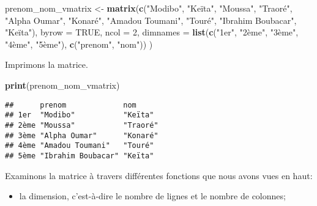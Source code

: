 \documentclass[]{book}
\newenvironment{Shaded}{\begin{snugshade}}{\end{snugshade}}
\newcommand{\KeywordTok}[1]{\textcolor[rgb]{0.13,0.29,0.53}{\textbf{#1}}}
\newcommand{\DataTypeTok}[1]{\textcolor[rgb]{0.13,0.29,0.53}{#1}}
\newcommand{\DecValTok}[1]{\textcolor[rgb]{0.00,0.00,0.81}{#1}}
\newcommand{\StringTok}[1]{\textcolor[rgb]{0.31,0.60,0.02}{#1}}
\newcommand{\OtherTok}[1]{\textcolor[rgb]{0.56,0.35,0.01}{#1}}
\newcommand{\NormalTok}[1]{#1}
\providecommand{\tightlist}{%
  \setlength{\itemsep}{0pt}\setlength{\parskip}{0pt}}
\begin{document}
\begin{Shaded}
\begin{Highlighting}[]
\NormalTok{prenom_nom_vmatrix <-}\StringTok{ }\KeywordTok{matrix}\NormalTok{(}\KeywordTok{c}\NormalTok{(}\StringTok{"Modibo"}\NormalTok{, }\StringTok{"Keïta"}\NormalTok{,}
                               \StringTok{"Moussa"}\NormalTok{, }\StringTok{"Traoré"}\NormalTok{,}
                               \StringTok{"Alpha Oumar"}\NormalTok{, }\StringTok{"Konaré"}\NormalTok{, }
                               \StringTok{"Amadou Toumani"}\NormalTok{, }\StringTok{"Touré"}\NormalTok{, }
                               \StringTok{"Ibrahim Boubacar"}\NormalTok{, }\StringTok{"Keïta"}\NormalTok{),}
                             \DataTypeTok{byrow =} \OtherTok{TRUE}\NormalTok{,}
                             \DataTypeTok{ncol =} \DecValTok{2}\NormalTok{,}
                             \DataTypeTok{dimnames =} \KeywordTok{list}\NormalTok{(}\KeywordTok{c}\NormalTok{(}\StringTok{"1er"}\NormalTok{, }\StringTok{"2ème"}\NormalTok{, }\StringTok{"3ème"}\NormalTok{, }\StringTok{"4ème"}\NormalTok{, }\StringTok{"5ème"}\NormalTok{), }
                                             \KeywordTok{c}\NormalTok{(}\StringTok{"prenom"}\NormalTok{, }\StringTok{"nom"}\NormalTok{))}
\NormalTok{                             )}
\end{Highlighting}
\end{Shaded}

Imprimons la matrice.

\begin{Shaded}
\begin{Highlighting}[]
\KeywordTok{print}\NormalTok{(prenom_nom_vmatrix)}
\end{Highlighting}
\end{Shaded}

\begin{verbatim}
##      prenom             nom     
## 1er  "Modibo"           "Keïta" 
## 2ème "Moussa"           "Traoré"
## 3ème "Alpha Oumar"      "Konaré"
## 4ème "Amadou Toumani"   "Touré" 
## 5ème "Ibrahim Boubacar" "Keïta"
\end{verbatim}

Examinons la matrice à travers différentes fonctions que nous avons vues
en haut:

\begin{itemize}
\tightlist
\item
  la dimension, c'est-à-dire le nombre de lignes et le nombre de
  colonnes;
\end{itemize}
\end{document}
